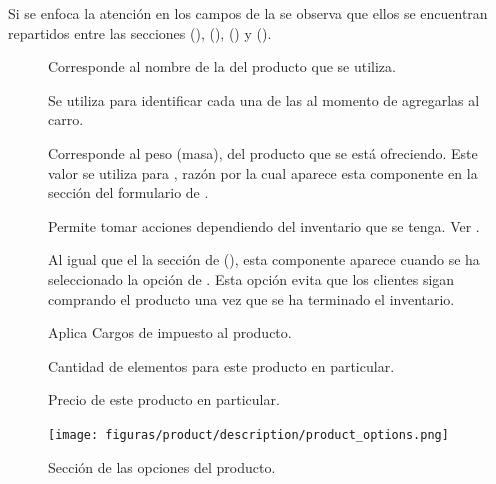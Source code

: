 		Si se enfoca la atención en los campos de la  se observa que ellos se encuentran repartidos entre las secciones \PricingForm(), \InventoryForm(), \ShippingForm() y \VariantsForm().

		\begin{description}
			\item [\LabelForm]
				Corresponde al nombre de la \VariantForm del producto que se utiliza.

			\item [\OptionForm]
				Se utiliza para identificar cada una de las \VariantsForm al momento de agregarlas al carro.

			\item [\WeightForm]
				Corresponde al peso (masa), del producto que se está ofreciendo. Este valor se utiliza para \shipping, razón por la cual aparece esta componente en la sección \ShippingForm del formulario de \shopifyNAME {}.

			\item [\trackingForm]
				Permite tomar acciones dependiendo del inventario que se tenga. Ver .

			\item [\denyForm]
				Al igual que el la sección \InventoryForm de \shopifyNAME(), esta componente aparece cuando se ha seleccionado la opción de \trackingForm. Esta opción evita que los clientes sigan comprando el producto una vez que se ha terminado el inventario.

			\item [\taxableForm]
				Aplica Cargos de impuesto al producto.

			\item [\quantityForm]
				Cantidad de elementos para este producto en particular.

			\item [\priceForm]
				Precio de este producto en particular.
		\end{description}

		\begin{figure}[H]
			\centering
			\texttt{[image: figuras/product/description/product\_options.png]}

			\caption{Sección de las opciones del producto.}
			\label{figure:product:description:product_options}
		\end{figure}

